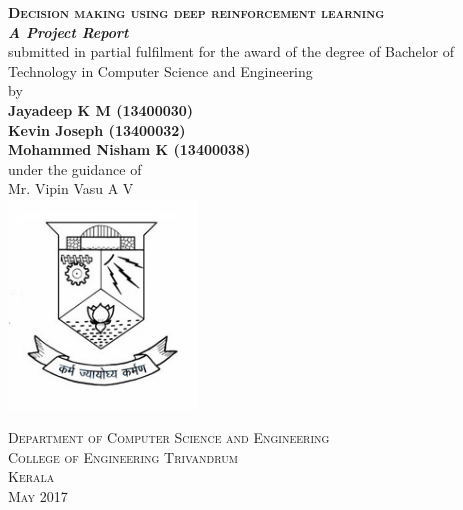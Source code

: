\documentclass[a4paper,11pt]{report}
\begin{document}
	\begin{titlepage}
		\begin{centering}
		 
		
		\textsc{\textbf{\LARGE{Decision making using deep reinforcement learning}}}\\[0.5cm]

		\textbf{\textit{\large{A Project Report}}}\\[1.5cm]

		\large{submitted in partial fulfilment for the award of the degree of Bachelor of Technology in Computer Science and Engineering}\\[1.5cm]

		\large{by}\\[0.5cm]

		\textbf{Jayadeep K M     (13400030)}\\
		\textbf{Kevin Joseph     (13400032)}\\
		\textbf{Mohammed Nisham K     (13400038)}\\[1.5cm]
		
		{under the guidance of}\\[0.25cm]
		\large{Mr. Vipin Vasu A V}\\[0.5cm]

		\includegraphics[width=5cm]{images/logo.jpg} 

		\textsc{Department of Computer Science and Engineering}\\
		\textsc{College of Engineering Trivandrum}\\
		\textsc{Kerala}\\[0.5cm]
		\textsc{May 2017}\\
		\vfill %
		\end{centering}
	\end{titlepage}
\end{document}
